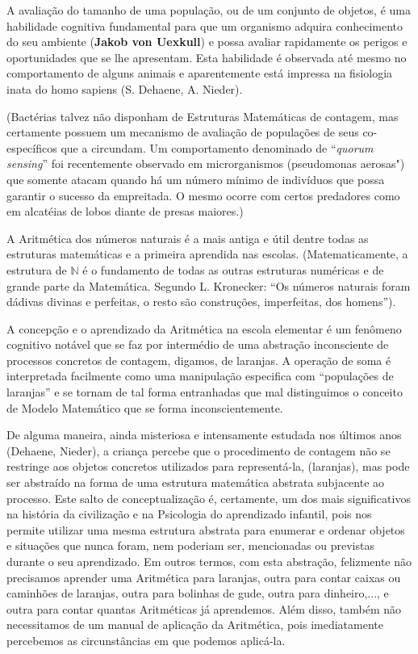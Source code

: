     A avaliação do tamanho de uma população, ou de um conjunto de objetos, é uma habilidade cognitiva fundamental para que um organismo adquira conhecimento do seu ambiente (\textbf{Jakob von Uexkull}) e possa avaliar rapidamente os perigos e oportunidades que se lhe apresentam. Esta habilidade é observada até mesmo no comportamento de alguns animais e aparentemente está impressa na fisiologia inata do homo sapiens (S. Dehaene, A. Nieder).
    
    (Bactérias talvez não disponham de Estruturas Matemáticas de contagem, mas certamente possuem um mecanismo de avaliação de populações de seus co-específicos que a circundam. Um comportamento denominado de ``\textit{quorum sensing}'' foi recentemente observado em microrganismos (pseudomonas aerosas") que somente atacam quando há um número mínimo de indivíduos que possa garantir o sucesso da empreitada. O mesmo ocorre com certos predadores como em alcatéias de lobos diante de presas maiores.)

    A Aritmética dos números naturais é a mais antiga e útil dentre todas as estruturas matemáticas e a primeira aprendida nas escolas. (Matematicamente, a estrutura de \(\mathbb{N}\) é o fundamento de todas as outras estruturas numéricas e de grande parte da Matemática. Segundo L. Kronecker: ``Os números naturais foram dádivas divinas e perfeitas, o resto são construções, imperfeitas, dos homens'').

    A concepção e o aprendizado da Aritmética na escola elementar é um fenômeno cognitivo notável que se faz por intermédio de uma abstração inconsciente de processos concretos de contagem, digamos, de laranjas. A operação de soma é interpretada facilmente como uma manipulação especifica com ``populações de laranjas'' e se tornam de tal forma entranhadas que mal distinguimos o conceito de Modelo Matemático que se forma inconscientemente.

    De alguma maneira, ainda misteriosa e intensamente estudada nos últimos anos (Dehaene, Nieder), a criança percebe que o procedimento de contagem não se restringe aos objetos concretos utilizados para representá-la, (laranjas), mas pode ser abstraído na forma de uma estrutura matemática abstrata subjacente ao processo. Este salto de conceptualização é, certamente, um dos mais significativos na história da civilização e na Psicologia do aprendizado infantil, pois nos permite utilizar uma mesma estrutura abstrata para enumerar e ordenar objetos e situações que nunca foram, nem poderiam ser, mencionadas ou previstas durante o seu aprendizado. Em outros termos, com esta abstração, felizmente não precisamos aprender uma Aritmética para laranjas, outra para contar caixas ou caminhões de laranjas, outra para bolinhas de gude, outra para dinheiro,..., e outra para contar quantas Aritméticas já aprendemos. Além disso, também não necessitamos de um manual de aplicação da Aritmética, pois imediatamente percebemos as circunstâncias em que podemos aplicá-la.

